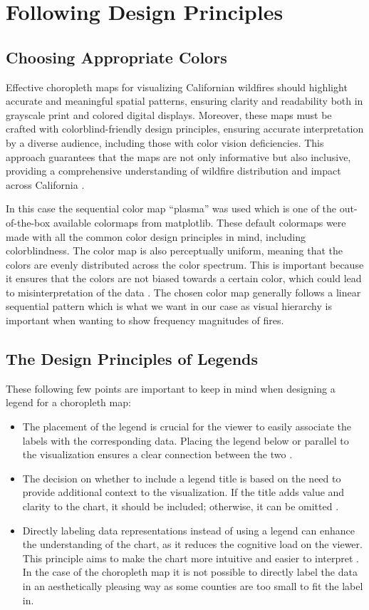 \section*{Following Design Principles}
\subsection*{Choosing Appropriate Colors}
Effective choropleth maps for visualizing Californian wildfires should highlight accurate and meaningful spatial patterns, ensuring clarity and readability both in grayscale print and colored digital displays. Moreover, these maps must be crafted with colorblind-friendly design principles, ensuring accurate interpretation by a diverse audience, including those with color vision deficiencies. This approach guarantees that the maps are not only informative but also inclusive, providing a comprehensive understanding of wildfire distribution and impact across California \cite{doughertyDesignChoroplethColors2021}.

In this case the sequential color map ``plasma'' was used which is one of the out-of-the-box available colormaps from matplotlib. These default colormaps were made with all the common color design principles in mind, including colorblindness. The color map is also perceptually uniform, meaning that the colors are evenly distributed across the color spectrum. This is important because it ensures that the colors are not biased towards a certain color, which could lead to misinterpretation of the data \cite{bergmanRulebasedToolAssisting1995}. The chosen color map generally follows a linear sequential pattern which is what we want in our case as visual hierarchy is important when wanting to show frequency magnitudes of fires.

\subsection*{The Design Principles of Legends}
These following few points are important to keep in mind when designing a legend for a choropleth map:
\begin{itemize}
    \item The placement of the legend is crucial for the viewer to easily associate the labels with the corresponding data. Placing the legend below or parallel to the visualization ensures a clear connection between the two \cite{LegendsDataVisualization}.
    \item The decision on whether to include a legend title is based on the need to provide additional context to the visualization. If the title adds value and clarity to the chart, it should be included; otherwise, it can be omitted \cite{LegendsDataVisualization}.
    \item Directly labeling data representations instead of using a legend can enhance the understanding of the chart, as it reduces the cognitive load on the viewer. This principle aims to make the chart more intuitive and easier to interpret \cite{CarbonDesignSystem}. In the case of the choropleth map it is not possible to directly label the data in an aesthetically pleasing way as some counties are too small to fit the label in.
\end{itemize}


